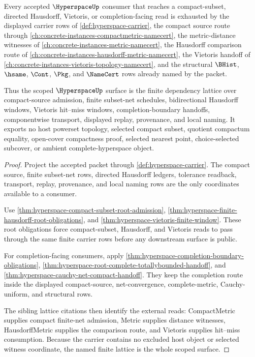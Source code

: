 \begin{theorem}
\label{thm:hyperspace-scoped-closure-route}
Every accepted $\HyperspaceUp$ consumer that reaches a compact-subset, directed Hausdorff, Vietoris, or completion-facing read is exhausted by the displayed carrier rows of \autoref{def:hyperspace-carrier}, the compact source route through \autoref{ch:concrete-instances-compactmetric-namecert}, the metric-distance witnesses of \autoref{ch:concrete-instances-metric-namecert}, the Hausdorff comparison route of \autoref{ch:concrete-instances-hausdorff-metric-namecert}, the Vietoris handoff of \autoref{ch:concrete-instances-vietoris-topology-namecert}, and the structural $\BHist$, $\hsame$, $\Cont$, $\Pkg$, and $\NameCert$ rows already named by the packet.

Thus the scoped $\HyperspaceUp$ surface is the finite dependency lattice over compact-source admission, finite subset-net schedules, bidirectional Hausdorff windows, Vietoris hit--miss windows, completion-boundary handoffs, componentwise transport, displayed replay, provenance, and local naming. It exports no host powerset topology, selected compact subset, quotient compactum equality, open-cover compactness proof, selected nearest point, choice-selected subcover, or ambient complete-hyperspace object.
\end{theorem}
\begin{proof}
Project the accepted packet through \autoref{def:hyperspace-carrier}. The compact source, finite subset-net rows, directed Hausdorff ledgers, tolerance readback, transport, replay, provenance, and local naming rows are the only coordinates available to a consumer.

Use \autoref{thm:hyperspace-compact-subset-root-admission}, \autoref{thm:hyperspace-finite-hausdorff-root-obligations}, and \autoref{thm:hyperspace-vietoris-finite-window}. These root obligations force compact-subset, Hausdorff, and Vietoris reads to pass through the same finite carrier rows before any downstream surface is public.

For completion-facing consumers, apply \autoref{thm:hyperspace-completion-boundary-obligations}, \autoref{thm:hyperspace-root-complete-totallybounded-handoff}, and \autoref{thm:hyperspace-cauchy-net-compact-handoff}. They keep the completion route inside the displayed compact-source, net-convergence, complete-metric, Cauchy-uniform, and structural rows.

The sibling lattice citations then identify the external reads: CompactMetric supplies compact finite-net admission, Metric supplies distance witnesses, HausdorffMetric supplies the comparison route, and Vietoris supplies hit--miss consumption. Because the carrier contains no excluded host object or selected witness coordinate, the named finite lattice is the whole scoped surface.
\end{proof}
